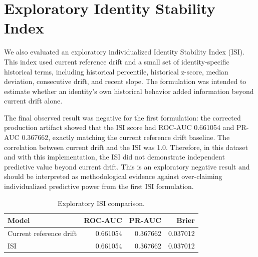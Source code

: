 \documentclass[conference]{IEEEtran}
\begin{document}
\section{Exploratory Identity Stability Index}
\label{sec:isi}
We also evaluated an exploratory individualized Identity Stability Index (ISI). This index used current reference drift and a small set of identity-specific historical terms, including historical percentile, historical z-score, median deviation, consecutive drift, and recent slope. The formulation was intended to estimate whether an identity's own historical behavior added information beyond current drift alone.

The final observed result was negative for the first formulation: the corrected production artifact showed that the ISI score had ROC-AUC 0.661054 and PR-AUC 0.367662, exactly matching the current reference drift baseline. The correlation between current drift and the ISI was 1.0. Therefore, in this dataset and with this implementation, the ISI did not demonstrate independent predictive value beyond current drift. This is an exploratory negative result and should be interpreted as methodological evidence against over-claiming individualized predictive power from the first ISI formulation.

\begin{table}[t]
\centering
\caption{Exploratory ISI comparison.}
\label{tab:isi}
\begin{tabular}{@{}lrrr@{}}
\toprule
Model & ROC-AUC & PR-AUC & Brier \\
\midrule
Current reference drift & 0.661054 & 0.367662 & 0.037012 \\
ISI & 0.661054 & 0.367662 & 0.037012 \\
\bottomrule
\end{tabular}
\end{table}
\end{document}

